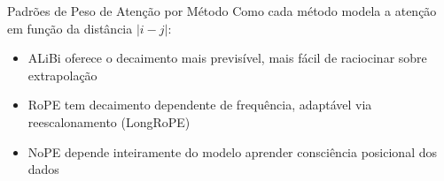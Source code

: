 \documentclass[aspectratio=169, xcolor=dvipsnames]{beamer}
\begin{document}
  \begin{frame}{Padrões de Peso de Atenção por Método}
    Como cada método modela a atenção em função da distância $|i - j|$:

    \vspace{0.3em}
    \centering

    \flushleft
    \begin{itemize}
      \item ALiBi oferece o decaimento mais previsível, mais fácil de raciocinar sobre extrapolação
      \item RoPE tem decaimento dependente de frequência, adaptável via reescalonamento (LongRoPE)
      \item NoPE depende inteiramente do modelo aprender consciência posicional dos dados
    \end{itemize}
  \end{frame}
\end{document}
